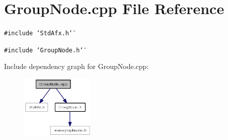 \section{GroupNode.cpp File Reference}
\label{GroupNode_8cpp}


{\tt \#include \char`\"{}StdAfx.h\char`\"{}}\par
{\tt \#include \char`\"{}GroupNode.h\char`\"{}}\par


Include dependency graph for GroupNode.cpp:\nopagebreak
\begin{figure}[H]
\begin{center}
\leavevmode
\includegraphics[width=100pt]{GroupNode_8cpp__incl}
\end{center}
\end{figure}
